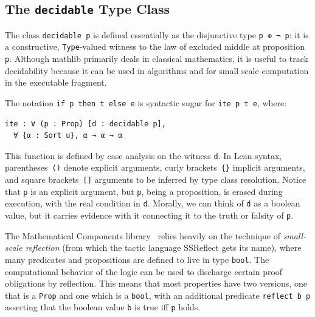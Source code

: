 \documentclass[sigplan]{acmart}\settopmatter{}
\newcommand{\mathlib}{\textsf{mathlib}\xspace}
\newcommand{\mathcomp}{Mathematical Components\xspace}
\begin{document}
\label{subsection:typeclasses:bundling}

\subsection{The \texttt{decidable} Type Class}
\label{subsection:typeclasses:decidability}

The class \lstinline{decidable p} is defined essentially as the disjunctive type \lstinline{p ⊕ ¬ p}: it is a constructive, \lstinline{Type}-valued witness to the law of excluded middle at proposition \lstinline{p}.
Although \mathlib primarily deals in classical mathematics, it is  useful to track decidability because it can be used in algorithms and for small scale computation in the executable fragment.

The notation \lstinline{if p then t else e} is syntactic sugar for \lstinline{ite p t e}, where:
\begin{lstlisting}
ite : ∀ (p : Prop) [d : decidable p],
  ∀ {α : Sort u}, α → α → α
\end{lstlisting}
This function is defined by case analysis on the witness \lstinline{d}.
In Lean syntax, parentheses~\lstinline{()} denote explicit arguments,
curly brackets~\lstinline|{}| implicit arguments,
and square brackets~\lstinline{[]} arguments to be inferred by type class resolution.
Notice that \lstinline{p} is an explicit argument, but \lstinline{p}, being a proposition, is erased during execution, with the real condition in \lstinline{d}.
Morally, we can think of \lstinline{d} as a boolean value, but it carries evidence with it connecting it to the truth or falsity of \lstinline{p}.

The \mathcomp library~\cite{Mahb17} relies heavily on the technique of \emph{small-scale reflection} (from which the tactic language SSReflect gets its name), where many predicates and propositions are defined to live in type \lstinline{bool}. The computational behavior of the logic can be used to discharge certain proof obligations by reflection.
This means that most properties have two versions, one that is a \lstinline{Prop} and one which is a \lstinline{bool}, with an additional predicate \lstinline{reflect b p} asserting that the boolean value \lstinline{b} is true iff \lstinline{p} holds.
\end{document}
